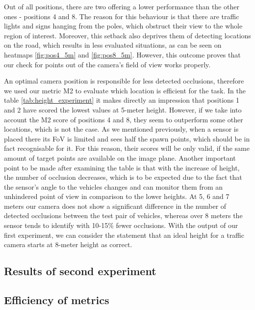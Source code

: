 Out of all positions, there are two offering a lower performance than the other ones - positions 4 and 8. The reason for this behaviour is that there are traffic lights and signs hanging from the poles, which obstruct their view to the whole region of interest. Moreover, this setback also deprives them of detecting locations on the road, which results in less evaluated situations, as can be seen on heatmaps \ref{fig:pos4_5m} and \ref{fig:pos8_5m}. However, this outcome proves that our check for points out of the camera's field of view works properly.

An optimal camera position is responsible for less detected occlusions, therefore we used our metric M2 to evaluate which location is efficient for the task. In the table \ref{tab:height_experiment} it makes directly an impression that positions 1 and 2 have scored the lowest values at 5-meter height. However, if we take into account the M2 score of positions 4 and 8, they seem to outperform some other locations, which is not the case. As we mentioned previously, when a sensor is placed there its FoV is limited and sees half the spawn points, which should be in fact recognisable for it. For this reason, their scores will be only valid, if the same amount of target points are available on the image plane. Another important point to be made after examining the table is that with the increase of height, the number of occlusion decreases, which is to be expected due to the fact that the sensor's angle to the vehicles changes and can monitor them from an unhindered point of view in comparison to the lower heights. At 5, 6 and 7 meters our camera does not show a significant difference in the number of detected occlusions between the test pair of vehicles, whereas over 8 meters the sensor tends to identify with 10-15\% fewer occlusions. With the output of our first experiment, we can consider the statement that an ideal height for a traffic camera starts at 8-meter height as correct.



\subsection{Results of second experiment}
\subsection{Efficiency of metrics}